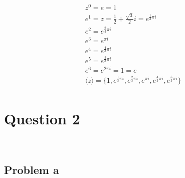 \documentclass{article}
\begin{document}
\begin{equation*}
    \begin{split}
        &z^0=e=1\\
        &e^1=z=\frac{1}{2}+\frac{\sqrt{3}}{2}i=e^{\frac{1}{3}\pi i}\\
        &e^2=e^{\frac{2}{3}\pi i}\\
        &e^3=e^{\pi i}\\
        &e^4=e^{\frac{4}{3}\pi i}\\
        &e^5=e^{\frac{5}{3}\pi i}\\
        &e^6=e^{2\pi i}=1=e\\
        &\langle z\rangle=\{1,e^{\frac{1}{3}\pi i},e^{\frac{2}{3}\pi i},e^{\pi i},e^{\frac{4}{3}\pi i},e^{\frac{5}{3}\pi i}\}\\
    \end{split}
\end{equation*}

\newpage

\section*{Question 2}

~

\subsection*{Problem a}
\end{document}
